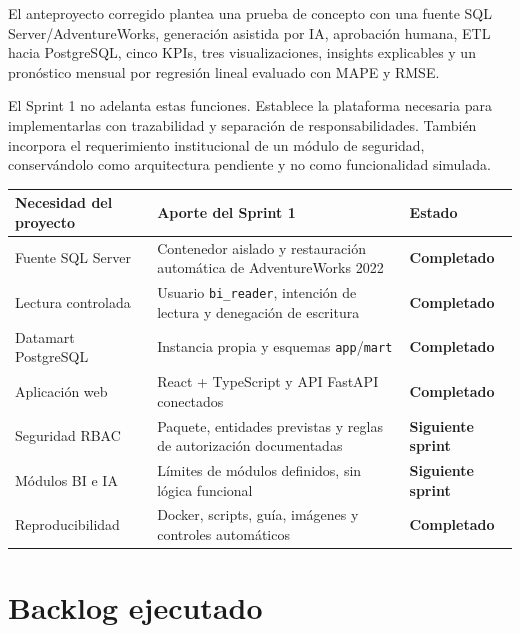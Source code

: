 \documentclass[11pt,letterpaper]{article}
\newcommand{\statusok}{\textcolor{deepgreen}{\textbf{Completado}}}
\newcommand{\statusnext}{\textcolor{warning}{\textbf{Siguiente sprint}}}
\newcommand{\file}[1]{\texttt{#1}}
\begin{document}
El anteproyecto corregido plantea una prueba de concepto con una fuente SQL Server/AdventureWorks, generación asistida por IA, aprobación humana, ETL hacia PostgreSQL, cinco KPIs, tres visualizaciones, insights explicables y un pronóstico mensual por regresión lineal evaluado con MAPE y RMSE.

El Sprint 1 no adelanta estas funciones. Establece la plataforma necesaria para implementarlas con trazabilidad y separación de responsabilidades. También incorpora el requerimiento institucional de un módulo de seguridad, conservándolo como arquitectura pendiente y no como funcionalidad simulada.

\begin{tabularx}{\textwidth}{@{}X X l@{}}
  \toprule
  Necesidad del proyecto & Aporte del Sprint 1 & Estado \\
  \midrule
  Fuente SQL Server & Contenedor aislado y restauración automática de AdventureWorks 2022 & \statusok \\
  Lectura controlada & Usuario \file{bi\_reader}, intención de lectura y denegación de escritura & \statusok \\
  Datamart PostgreSQL & Instancia propia y esquemas \file{app}/\file{mart} & \statusok \\
  Aplicación web & React + TypeScript y API FastAPI conectados & \statusok \\
  Seguridad RBAC & Paquete, entidades previstas y reglas de autorización documentadas & \statusnext \\
  Módulos BI e IA & Límites de módulos definidos, sin lógica funcional & \statusnext \\
  Reproducibilidad & Docker, scripts, guía, imágenes y controles automáticos & \statusok \\
  \bottomrule
\end{tabularx}

\section{Backlog ejecutado}
\end{document}
